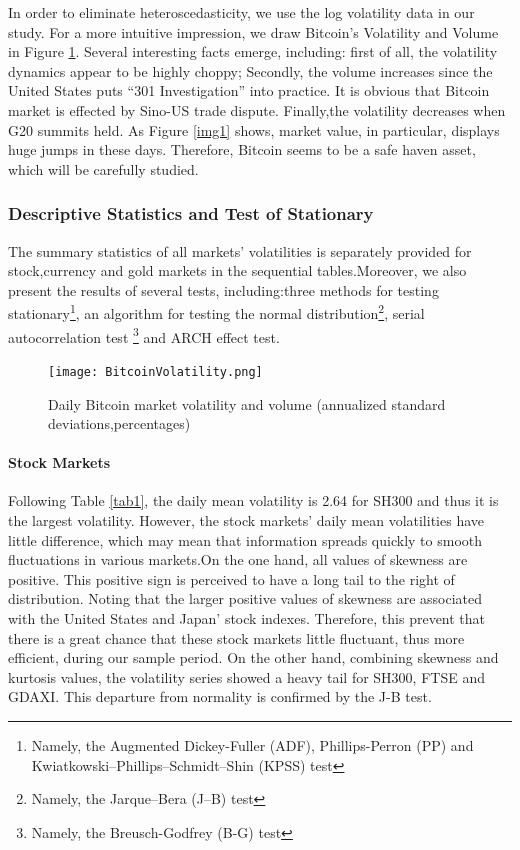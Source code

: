 \documentclass[review]{elsarticle}
\begin{document}
In order to eliminate heteroscedasticity, we use the log volatility data in our study. For a more intuitive impression, we draw Bitcoin's Volatility and Volume in Figure \ref{img2}. Several interesting facts emerge, including: first of all, the volatility dynamics appear to be highly choppy; Secondly, the volume increases since the United States puts ``301 Investigation'' into practice. It is obvious that Bitcoin market is effected by Sino-US trade dispute. Finally,the volatility decreases when G20 summits held. As Figure \ref{img1} shows, market value, in particular, displays huge jumps in these days. Therefore, Bitcoin seems to be a safe haven asset, which will be carefully studied. 
 
\subsubsection{Descriptive Statistics and Test of Stationary}The summary statistics of all markets' volatilities is separately provided for stock,currency and gold markets in the sequential tables.Moreover, we also present the results of several tests, including:three methods for testing stationary\footnote{Namely, the Augmented Dickey-Fuller (ADF), Phillips-Perron (PP) and Kwiatkowski–Phillips–Schmidt–Shin (KPSS) test}, an algorithm for testing the normal distribution\footnote{Namely, the Jarque–Bera (J–B) test}, serial autocorrelation test \footnote{Namely, the Breusch-Godfrey (B-G) test} and ARCH effect test. 

\begin{figure}[htbp]		
	\centering
	\texttt{[image: BitcoinVolatility.png]}
	\caption{Daily Bitcoin market volatility and volume (annualized standard deviations,percentages)}
	\label{img2}
\end{figure}

\paragraph{Stock Markets}
Following Table \ref{tab1}, the daily mean volatility is 2.64 for SH300 and thus it is the largest volatility. However, the stock markets' daily mean volatilities have little difference, which may mean that information spreads quickly to smooth fluctuations in various markets.On the one hand, all values of skewness are positive. This positive sign is perceived to have a long tail to the right of distribution. Noting that the larger positive values of skewness are associated with the United States and Japan' stock indexes. Therefore, this prevent that there is a great chance that these stock markets little fluctuant, thus more efficient, during our sample period. On the other hand, combining skewness and kurtosis values, the volatility series showed a heavy tail for SH300, FTSE and GDAXI. This departure from normality is confirmed by the J-B test.
\end{document}
